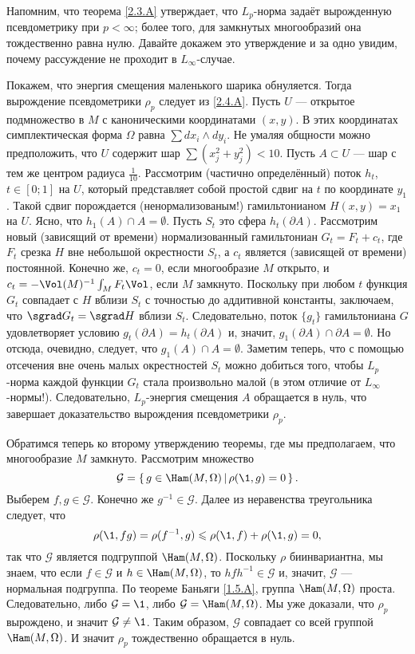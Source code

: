 Напомним, что теорема \ref{2.3.A} утверждает, что $L_p$-норма задаёт вырожденную псевдометрику при $p <\infty$;
более того, для замкнутых многообразий она тождественно равна нулю.
Давайте докажем это утверждение и за одно увидим, почему рассуждение не проходит в $L_\infty$-случае.

Покажем, что энергия смещения маленького шарика обнуляется.
Тогда вырождение псевдометрики $\rho_p$ следует из \ref{2.4.A}.
Пусть $U$ — открытое подмножество в $M$ с каноническими координатами $(x, y)$.
В этих координатах симплектическая форма $\Omega$ равна $\sum dx_i\wedge dy_i$.
Не умаляя общности можно предположить, что $U$ содержит шар $\sum(x^2_j + y_j^2) <10$.
Пусть $A \subset U$ — шар с тем же центром радиуса $\tfrac1{10}$.
Рассмотрим (частично определённый) поток $h_t$, $t \in [0; 1]$ на $U$, который представляет собой простой сдвиг на $t$ по координате $y_1$.
Такой сдвиг порождается (ненормализованым!) гамильтонианом $H (x, y) = x_1$ на $U$.
Ясно, что $h_1 (A) \cap A = \emptyset$.
Пусть $S_t$ это сфера $h_t (\partial A)$.
Рассмотрим новый (зависящий от времени) нормализованный гамильтониан
$G_t = F_t + c_t$, где $F_t$ срезка $H$ вне небольшой окрестности $S_t$, а $c_t$ является (зависящей от времени) постоянной.
Конечно же, $c_t = 0$, если многообразие $M$ открыто, и $c_t = -\Vol(M)^{-1}\int_M F_t \Vol$, если $M$ замкнуто.
Поскольку при любом $t$ функция $G_t$ совпадает с $H$ вблизи $S_t$ с точностью до аддитивной константы, заключаем, что $\sgrad G_t = \sgrad H$ вблизи $S_t$.
Следовательно, поток $\{g_t\}$ гамильтониана $G$ удовлетворяет условию $g_t (\partial A) = h_t (\partial A)$ и, значит, $g_1 (\partial A) \cap \partial A = \emptyset$.
Но отсюда, очевидно, следует, что $g_1 (A) \cap A = \emptyset$.
Заметим теперь, что с помощью отсечения вне очень малых окрестностей $S_t$ можно добиться того, чтобы $L_p$-норма каждой функции $G_t$ стала произвольно малой (в этом отличие от $L_\infty$-нормы!).
Следовательно, $L_p$-энергия смещения $A$ обращается в нуль, что завершает доказательство вырождения псевдометрики $\rho_p$.

Обратимся теперь ко второму утверждению теоремы, где мы предполагаем, что многообразие $M$ замкнуто.
Рассмотрим множество
\[\mathcal{G} = \set{g \in \Ham (M, \Omega)}{\rho (\1, g) = 0}.\]
Выберем $f, g \in \mathcal{G}$.
Конечно же $g^{-1} \in \mathcal{G}$.
Далее из неравенства треугольника следует, что 
\[\rho (\1, f g) = \rho (f^{-1}, g) \le \rho (\1, f) + \rho (\1, g) = 0,\]
так что $\mathcal{G}$ является подгруппой $\Ham (M, \Omega)$.
Поскольку $\rho$ биинвариантна, мы знаем, что если $f \in \mathcal{G}$ и $h \in \Ham (M, \Omega)$, то $hf h^{-1} \in \mathcal{G}$ и, значит, $\mathcal{G}$ — нормальная подгруппа.
По теореме Баньяги \ref{1.5.A}, группа $\Ham (M, \Omega)$ проста.
Следовательно, либо $\mathcal{G} = {\1}$, либо $\mathcal{G} = \Ham (M, \Omega)$.
Мы уже доказали, что $\rho_p$ вырождено, и значит $\mathcal{G} \ne {\1}$.
Таким образом, $\mathcal{G}$ совпадает со всей группой $\Ham (M, \Omega)$.
И значит $\rho_p$ тождественно обращается в нуль.
\qeds

